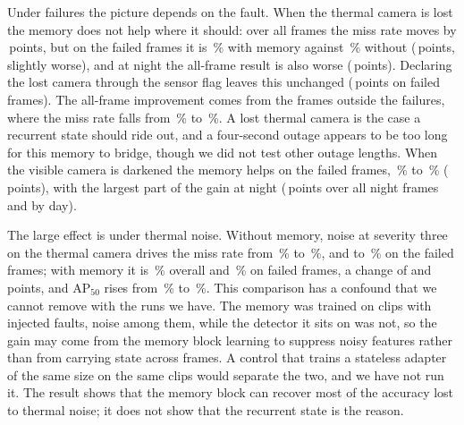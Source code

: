 Under failures the picture depends on the fault. When the thermal camera is lost the memory does not help where it should: over all frames the miss rate moves by \memChangeThermalLostAllMr{}\,points, but on the failed frames it is \memThermalLostMemoryFailedMr{}\,\% with memory against \memThermalLostImageFailedMr{}\,\% without (\memChangeThermalLostFailedMr{}\,points, slightly worse), and at night the all-frame result is also worse (\memChangeThermalLostNightMr{}\,points). Declaring the lost camera through the sensor flag leaves this unchanged (\memChangeThermalLostFlaggedFailedMr{}\,points on failed frames). The all-frame improvement comes from the frames outside the failures, where the miss rate falls from \memThermalLostImageHealthyMr{}\,\% to \memThermalLostMemoryHealthyMr{}\,\%. A lost thermal camera is the case a recurrent state should ride out, and a four-second outage appears to be too long for this memory to bridge, though we did not test other outage lengths. When the visible camera is darkened the memory helps on the failed frames, \memVisibleDarkImageFailedMr{}\,\% to \memVisibleDarkMemoryFailedMr{}\,\% (\memChangeVisibleDarkFailedMr{}\,points), with the largest part of the gain at night (\memChangeVisibleDarkNightMr{}\,points over all night frames and \memChangeVisibleDarkDayMr{} by day).

The large effect is under thermal noise. Without memory, noise at severity three on the thermal camera drives the miss rate from \memCleanImageAllMr{}\,\% to \memThermalNoiseImageAllMr{}\,\%, and to \memThermalNoiseImageFailedMr{}\,\% on the failed frames; with memory it is \memThermalNoiseMemoryAllMr{}\,\% overall and \memThermalNoiseMemoryFailedMr{}\,\% on failed frames, a change of \memChangeThermalNoiseAllMr{} and \memChangeThermalNoiseFailedMr{}\,points, and AP$_{50}$ rises from \memThermalNoiseImageAllApFifty{}\,\% to \memThermalNoiseMemoryAllApFifty{}\,\%. This comparison has a confound that we cannot remove with the runs we have. The memory was trained on clips with injected faults, noise among them, while the detector it sits on was not, so the gain may come from the memory block learning to suppress noisy features rather than from carrying state across frames. A control that trains a stateless adapter of the same size on the same clips would separate the two, and we have not run it. The result shows that the memory block can recover most of the accuracy lost to thermal noise; it does not show that the recurrent state is the reason.

